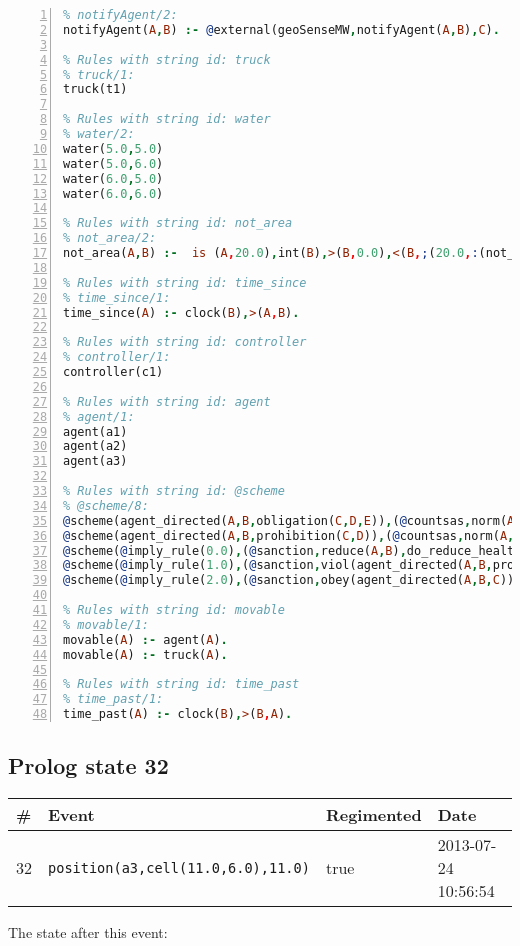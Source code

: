 \documentclass[11pt]{article}\usepackage[utf8]{inputenc}\usepackage{geometry}
\begin{document}
\begin{lstlisting}[language=Prolog, numbers=left]
% Rules with string id: notifyAgent
% notifyAgent/2:
notifyAgent(A,B) :- @external(geoSenseMW,notifyAgent(A,B),C).

% Rules with string id: truck
% truck/1:
truck(t1)

% Rules with string id: water
% water/2:
water(5.0,5.0)
water(5.0,6.0)
water(6.0,5.0)
water(6.0,6.0)

% Rules with string id: not_area
% not_area/2:
not_area(A,B) :-  is (A,20.0),int(B),>(B,0.0),<(B,;(20.0,:(not_area(A,B), is (-(B),20.0)))),int(A),>(A,0.0),<(A,;(20.0,:(area(A,B),-(int(A))))),int(B),>(A,0.0),>(B,0.0),<(A,21.0),<(B,21.0).

% Rules with string id: time_since
% time_since/1:
time_since(A) :- clock(B),>(A,B).

% Rules with string id: controller
% controller/1:
controller(c1)

% Rules with string id: agent
% agent/1:
agent(a1)
agent(a2)
agent(a3)

% Rules with string id: @scheme
% @scheme/8:
@scheme(agent_directed(A,B,obligation(C,D,E)),(@countsas,norm(A,B,F,obligation(C,D,E)),F),false,(listTrue(C)),(time_past(D)),false,[plus(viol(agent_directed(A,B,obligation(C,D,E))))|[]],[plus(obey(agent_directed(A,B,obligation(C,D,E))))|[]])
@scheme(agent_directed(A,B,prohibition(C,D)),(@countsas,norm(A,B,E,prohibition(C,D)),E),(listTrue(C)),false,(false),false,[plus(viol(agent_directed(A,B,prohibition(C,D))))|[]],[plus(obey(agent_directed(A,B,prohibition(C,D))))|[]])
@scheme(@imply_rule(0.0),(@sanction,reduce(A,B),do_reduce_health(A,B),notifyAgent(A,changed(status))),true,false,false,false,[min(reduce(A,B))|[]],[])
@scheme(@imply_rule(1.0),(@sanction,viol(agent_directed(A,B,prohibition(C,D))),do_sanction(D)),true,false,false,false,[min(viol(agent_directed(A,B,prohibition(C,D))))|[]],[])
@scheme(@imply_rule(2.0),(@sanction,obey(agent_directed(A,B,C))),true,false,false,false,[min(obey(agent_directed(A,B,C)))|[]],[])

% Rules with string id: movable
% movable/1:
movable(A) :- agent(A).
movable(A) :- truck(A).

% Rules with string id: time_past
% time_past/1:
time_past(A) :- clock(B),>(B,A).

\end{lstlisting}
\clearpage 
\subsection{Prolog state 32}
\begin{table}[ht]
\centering 
\begin{tabular}{l l l l} 
\textbf{\#} & \textbf{Event} & \textbf{Regimented} & \textbf{Date} \\ [0.5ex] 
\hline
32&\texttt{position(a3,cell(11.0,6.0),11.0)}&true&2013-07-24 10:56:54\\ [1ex] \hline\end{tabular}
\end{table}
The state after this event:
\end{document}
